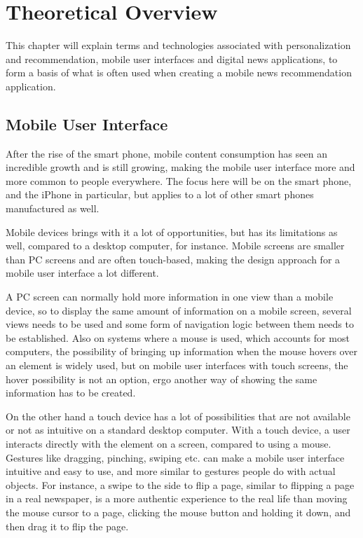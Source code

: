 \chapter{Theoretical Overview}
This chapter will explain terms and technologies associated with personalization and recommendation, mobile user interfaces and digital news applications, to form a basis of what is often used when creating a mobile news recommendation application.


\section{Mobile User Interface}
After the rise of the smart phone, mobile content consumption has seen an incredible growth and is still growing\cite{emarketer2012moretime}, making the mobile user interface more and more common to people everywhere. The focus here will be on the smart phone, and the iPhone in particular, but applies to a lot of other smart phones manufactured as well.

Mobile devices brings with it a lot of opportunities, but has its limitations as well, compared to a desktop computer, for instance. Mobile screens are smaller than PC screens and are often touch-based, making the design approach for a mobile user interface a lot different.

A PC screen can normally hold more information in one view than a mobile device, so to display the same amount of information on a mobile screen, several views needs to be used and some form of navigation logic between them needs to be established. Also on systems where a mouse is used, which accounts for most computers, the possibility of bringing up information when the mouse hovers over an element is widely used, but on mobile user interfaces with touch screens, the hover possibility is not an option, ergo another way of showing the same information has to be created. 

On the other hand a touch device has a lot of possibilities that are not available or not as intuitive on a standard desktop computer. With a touch device, a user interacts directly with the element on a screen, compared to using a mouse. Gestures like dragging, pinching, swiping etc. can make a mobile user interface intuitive and easy to use, and more similar to gestures people do with actual objects. For instance, a swipe to the side to flip a page, similar to flipping a page in a real newspaper, is a more authentic experience to the real life than moving the mouse cursor to a page, clicking the mouse button and holding it down, and then drag it to flip the page.

